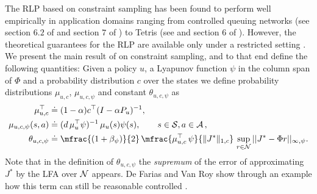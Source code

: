 The RLP based on constraint sampling has been found to perform well empirically in application domains ranging from controlled queuing networks (see section $6.2$ of \cite{ALP} and section $7$ of \cite{SALP}) to Tetris (see \cite{CST} and section $6$ of \cite{SALP}). However, the theoretical guarantees for the RLP are available only under a restricted setting \cite{CS}. We present the main result of \cite{CS} on constraint sampling, and to that end define the following quantities:
Given a policy $u$, a Lyapunov function $\psi$ in the column span of $\Phi$
and a probability distribution $c$ over the states
we define probability distributions $\mu_{u,c}$, $\mu_{u,c,\psi}$ and constant $\theta_{u,c,\psi}$ as 
\begin{align}
\mu_{u,c}^\top& \eqdef (1-\alpha)c^\top (I-\alpha P_u)^{-1},\nn\\
\mu_{u,c,\psi}(s,a)&\eqdef (d \, \mu_u^\top \psi)^{-1} \, \mu_{u}(s) \psi(s),\nn\qquad s\in \S,a\in  \A\,,\\
\theta_{u,c,\psi} &\eqdef\mfrac{(1+\beta_{\psi})}{2} \, \mfrac{\mu_{u,c}^\top \,\psi}{\norm{J^*}_{1,c}}\, \sup_{r\in \N}||J^*-\Phi r||_{\mn}.
\end{align}
Note that in the definition of $\theta_{u,c,\psi}$ the \emph{supremum} 
of the error of approximating $J^*$ by the LFA over $\mathcal{N}$ appears.
De Farias and Van Roy show through an example how this term can still be reasonable controlled  \cite{CS}.

